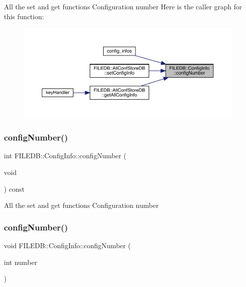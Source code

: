 All the set and get functions Configuration number Here is the caller graph for this function\+:\nopagebreak
\begin{figure}[H]
\begin{center}
\leavevmode
\includegraphics[width=350pt]{d0/d90/classFILEDB_1_1ConfigInfo_ae4526dad4c6de972b1eb25ee8cd11c67_icgraph}
\end{center}
\end{figure}
\mbox{\label{classFILEDB_1_1ConfigInfo_ae4526dad4c6de972b1eb25ee8cd11c67}} 
\subsubsection{\texorpdfstring{configNumber()}{configNumber()}\hspace{0.1cm}{\footnotesize\ttfamily [2/4]}}
{\footnotesize\ttfamily int F\+I\+L\+E\+D\+B\+::\+Config\+Info\+::config\+Number (\begin{DoxyParamCaption}\item[{void}]{ }\end{DoxyParamCaption}) const}

All the set and get functions Configuration number \mbox{\label{classFILEDB_1_1ConfigInfo_a226c79a0ee78d03894cfb6b7ed207992}} 
\subsubsection{\texorpdfstring{configNumber()}{configNumber()}\hspace{0.1cm}{\footnotesize\ttfamily [3/4]}}
{\footnotesize\ttfamily void F\+I\+L\+E\+D\+B\+::\+Config\+Info\+::config\+Number (\begin{DoxyParamCaption}\item[{int}]{number }\end{DoxyParamCaption})}

